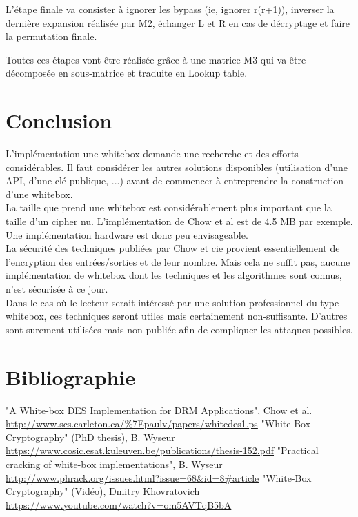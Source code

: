 \documentclass[a4paper,12pt]{article}
\begin{document}
L'étape finale va consister à ignorer les bypass (ie, ignorer r(r+1)), inverser la dernière expansion réalisée par M2, échanger L et R en cas de décryptage et faire la permutation finale.

Toutes ces étapes vont être réalisée grâce à une matrice M3 qui va être décomposée en sous-matrice et traduite en Lookup table.

\newpage

\section{Conclusion}

L'implémentation une whitebox demande une recherche et des efforts considérables. Il faut considérer les autres solutions disponibles (utilisation d'une API, d'une clé publique, ...) avant de commencer à entreprendre la construction d'une whitebox.\\

La taille que prend une whitebox est considérablement plus important que la taille d'un cipher nu. L'implémentation de Chow et al est de 4.5 MB par exemple. Une implémentation hardware est donc peu envisageable.\\

La sécurité des techniques publiées par Chow et cie provient essentiellement de l'encryption des entrées/sorties et de leur nombre. Mais cela ne suffit pas, aucune implémentation de whitebox dont les techniques et les algorithmes sont connus, n'est sécurisée à ce jour.\\

Dans le cas où le lecteur serait intéressé par une solution professionnel du type whitebox, ces techniques seront utiles mais certainement non-suffisante. D'autres sont surement utilisées mais non publiée afin de compliquer les attaques possibles.\\

\newpage

\section{Bibliographie}

"A White-box DES Implementation for DRM Applications", Chow et al.\\
\url{http://www.scs.carleton.ca/%7Epaulv/papers/whitedes1.ps}
"White-Box Cryptography" (PhD thesis), B. Wyseur\\
\url{https://www.cosic.esat.kuleuven.be/publications/thesis-152.pdf}
"Practical cracking of white-box implementations", B. Wyseur\\
\url{http://www.phrack.org/issues.html?issue=68&id=8#article}
"White-Box Cryptography" (Vidéo), Dmitry Khovratovich\\
\url{https://www.youtube.com/watch?v=om5AVTqB5bA}
\end{document}
